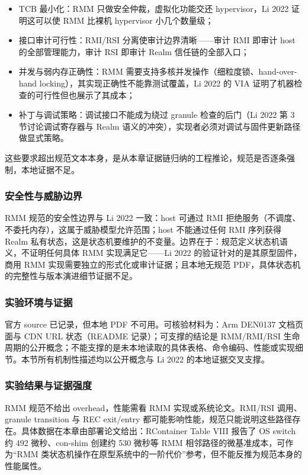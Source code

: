 \documentclass[11pt]{ctexart}
\begin{document}
\begin{itemize}
\item TCB 最小化：RMM 只做安全仲裁，虚拟化功能交还 hypervisor，Li 2022 证明这可以使 RMM 比裸机 hypervisor 小几个数量级；
\item 接口审计可行性：RMI/RSI 分离使审计边界清晰——审计 RMI 即审计 host 的全部管理能力，审计 RSI 即审计 Realm 信任链的全部入口；
\item 并发与弱内存正确性：RMM 需要支持多核并发操作（细粒度锁、hand-over-hand locking），其实现正确性不能靠测试覆盖，Li 2022 的 VIA 证明了机器检查的可行性但也展示了其成本；
\item 补丁与调试策略：调试接口不能成为绕过 granule 检查的后门（Li 2022 第 3 节讨论调试寄存器与 Realm 语义的冲突），实现者必须对调试与固件更新路径做显式策略。
\end{itemize}
这些要求超出规范文本本身，是从本章证据链归纳的工程推论，规范是否逐条强制，本地证据不足。\par
\subsubsection{安全性与威胁边界}
RMM 规范的安全性边界与 Li 2022 一致：host 可通过 RMI 拒绝服务（不调度、不委托内存），这属于威胁模型允许范围；host 不能通过任何 RMI 序列获得 Realm 私有状态，这是状态机要维护的不变量。边界在于：规范定义状态机语义，不证明任何具体 RMM 实现满足它——Li 2022 的验证针对的是其原型固件，商用 RMM 实现需要独立的形式化或审计证据；且本地无规范 PDF，具体状态机的完整性与版本演进细节证据不足。\par
\subsubsection{实验环境与证据}
官方 source 已记录，但本地 PDF 不可用。可核验材料为：Arm DEN0137 文档页面与 CDN URL 状态（README 记录）；可支撑的结论是 RMM/RMI/RSI 生命周期的公开概念；不能支撑的是未本地读取的具体表格、命令编码、性能或实现细节。本节所有机制性描述均以公开概念与 Li 2022 的本地证据交叉支撑。\par
\subsubsection{实验结果与证据强度}
RMM 规范不给出 overhead，性能需看 RMM 实现或系统论文。RMI/RSI 调用、granule transition 与 REC exit/entry 都可能影响性能，规范只能说明这些路径存在。具体数据在本章由部署论文给出：RContainer Table VIII 报告了 OS switch 约 492 微秒、con-shim 创建约 530 微秒等 RMM 相邻路径的微基准成本，可作为“RMM 类状态机操作在原型系统中的一阶代价”参考，但不能反推为规范本身的性能属性。\par
\end{document}
